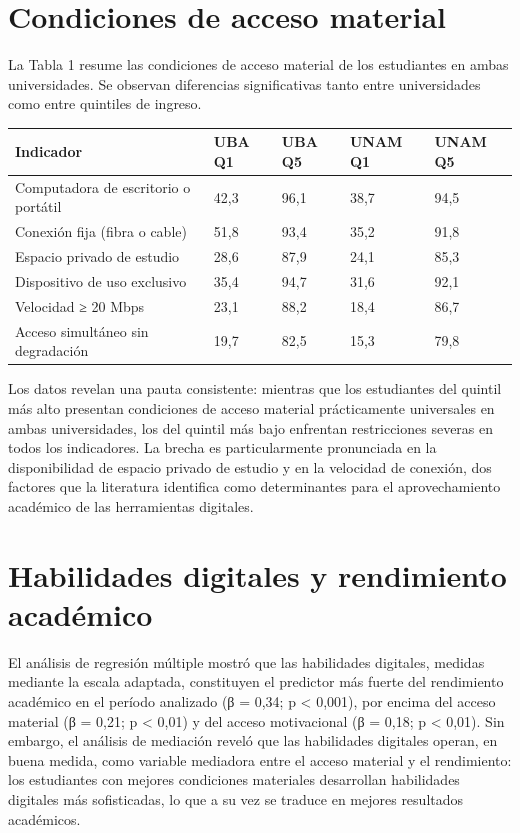 \section{Condiciones de acceso material}
La Tabla 1 resume las condiciones de acceso material de los estudiantes en ambas universidades. Se observan diferencias significativas tanto entre universidades como entre quintiles de ingreso.


\begin{table}[!ht]
\centering
{\sf\footnotesize\setlength\tabcolsep{4pt}%
  \begin{tabular}{@{}lllll@{}}
    \toprule
    \textbf{\textbf{Indicador}} & \textbf{\textbf{UBA Q1}} & \textbf{\textbf{UBA Q5}} & \textbf{\textbf{UNAM Q1}} & \textbf{\textbf{UNAM Q5}} \\
    \midrule
    Computadora de escritorio o portátil & 42,3 & 96,1 & 38,7 & 94,5 \\
    \midrule
    Conexión fija (fibra o cable) & 51,8 & 93,4 & 35,2 & 91,8 \\
    \midrule
    Espacio privado de estudio & 28,6 & 87,9 & 24,1 & 85,3 \\
    \midrule
    Dispositivo de uso exclusivo & 35,4 & 94,7 & 31,6 & 92,1 \\
    \midrule
    Velocidad ≥ 20 Mbps & 23,1 & 88,2 & 18,4 & 86,7 \\
    \midrule
    Acceso simultáneo sin degradación & 19,7 & 82,5 & 15,3 & 79,8 \\
    \bottomrule
  \end{tabular}
}%
\label{tbl-1}
\end{table}

Los datos revelan una pauta consistente: mientras que los estudiantes del quintil más alto presentan condiciones de acceso material prácticamente universales en ambas universidades, los del quintil más bajo enfrentan restricciones severas en todos los indicadores. La brecha es particularmente pronunciada en la disponibilidad de espacio privado de estudio y en la velocidad de conexión, dos factores que la literatura identifica como determinantes para el aprovechamiento académico de las herramientas digitales.


\section{Habilidades digitales y rendimiento académico}
El análisis de regresión múltiple mostró que las habilidades digitales, medidas mediante la escala adaptada, constituyen el predictor más fuerte del rendimiento académico en el período analizado (β = 0,34; p < 0,001), por encima del acceso material (β = 0,21; p < 0,01) y del acceso motivacional (β = 0,18; p < 0,01). Sin embargo, el análisis de mediación reveló que las habilidades digitales operan, en buena medida, como variable mediadora entre el acceso material y el rendimiento: los estudiantes con mejores condiciones materiales desarrollan habilidades digitales más sofisticadas, lo que a su vez se traduce en mejores resultados académicos.


